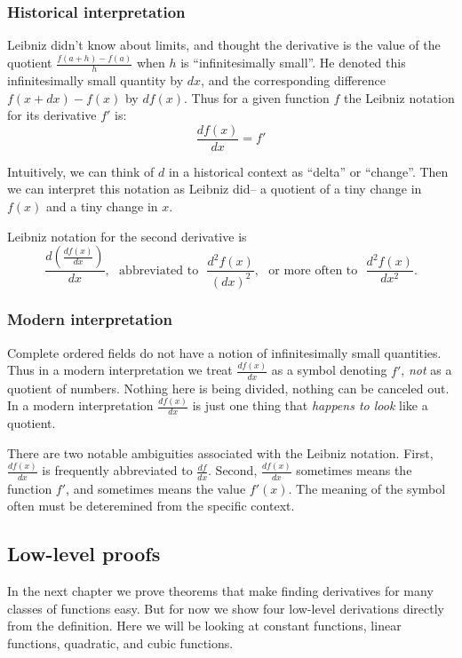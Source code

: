 \subsubsection*{Historical interpretation}

Leibniz didn't know about limits, and thought the derivative is the
value of the quotient $\frac{f(a+h)-f(a)}{h}$ when $h$ is
``infinitesimally small''. He denoted this infinitesimally small
quantity by $dx$, and the corresponding difference $f(x+dx)-f(x)$ by
$df(x)$. Thus for a given function $f$ the Leibniz notation for its
derivative $f'$ is:
\[\frac{df(x)}{dx}=f'\]

Intuitively, we can think of $d$ in a historical context as ``delta''
or ``change''. Then we can interpret this notation as Leibniz did-- a
quotient of a tiny change in $f(x)$ and a tiny change in $x$.

\vs

Leibniz notation for the second derivative is
\[\frac{d\left(\frac{df(x)}{dx}\right)}{dx},\ \ \ \text{abbreviated
    to}\ \ \ \frac{d^2f(x)}{(dx)^2}, \ \ \ \text{or more often to}\ \
  \ \frac{d^2f(x)}{dx^2}.\]

\subsubsection*{Modern interpretation}

Complete ordered fields do not have a notion of infinitesimally small
quantities. Thus in a modern interpretation we treat
$\frac{df(x)}{dx}$ as a symbol denoting $f'$, \textit{not} as a
quotient of numbers. Nothing here is being divided, nothing can be
canceled out. In a modern interpretation $\frac{df(x)}{dx}$ is just
one thing that \textit{happens to look} like a quotient.

\vs

There are two notable ambiguities associated with the Leibniz
notation. First, $\frac{df(x)}{dx}$ is frequently abbreviated to
$\frac{df}{dx}$. Second, $\frac{df(x)}{dx}$ sometimes means the
function $f'$, and sometimes means the value $f'(x)$. The meaning of
the symbol often must be deteremined from the specific context.

\subsection{Low-level proofs}

In the next chapter we prove theorems that make finding derivatives
for many classes of functions easy. But for now we show four low-level
derivations directly from the definition. Here we will be looking at
constant functions, linear functions, quadratic, and cubic functions.

